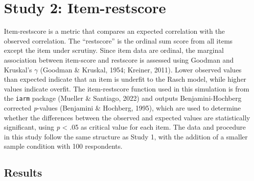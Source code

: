 \documentclass[
  letterpaper,
  DIV=11,
  numbers=noendperiod]{scrartcl}
\begin{document}
\section{Study 2: Item-restscore}\label{study-2-item-restscore}

Item-restscore is a metric that compares an expected correlation with
the observed correlation. The ``restscore'' is the ordinal sum score
from all items except the item under scrutiny. Since item data are
ordinal, the marginal association between item-score and restscore is
assessed using Goodman and Kruskal's \(\gamma\) (Goodman \& Kruskal,
1954; Kreiner, 2011). Lower observed values than expected indicate that
an item is underfit to the Rasch model, while higher values indicate
overfit. The item-restscore function used in this simulation is from the
\texttt{iarm} package (Mueller \& Santiago, 2022) and outputs
Benjamini-Hochberg corrected \emph{p}-values (Benjamini \& Hochberg,
1995), which are used to determine whether the differences between the
observed and expected values are statistically significant, using
\emph{p} \textless{} .05 as critical value for each item. The data and
procedure in this study follow the same structure as Study 1, with the
addition of a smaller sample condition with 100 respondents.

\subsection{Results}\label{results-1}
\end{document}
